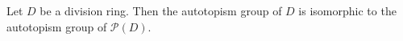 Let $D$ be a division ring. Then the autotopism group of $D$ is isomorphic to the autotopism group of $\mathcal{P}(D)$.
